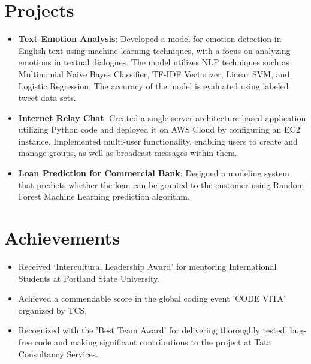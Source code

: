 \documentclass[letterpaper,11pt]{article}
\newcommand{\resumeItem}[2]{
  \item\small{
    \textbf{#1}{: #2 \vspace{-2pt}}
  }
}
\newcommand{\resumeSubItem}[2]{\resumeItem{#1}{#2}\vspace{-4pt}}
\newcommand{\resumeSubHeadingListStart}{\begin{itemize}[leftmargin=*]}
\newcommand{\resumeSubHeadingListEnd}{\end{itemize}}
\newcommand{\resumeItemListStart}{\begin{itemize}}
\newcommand{\resumeItemListEnd}{\end{itemize}\vspace{-5pt}}
\begin{document}
\section{Projects}
  \resumeSubHeadingListStart
    \resumeSubItem{Text Emotion Analysis}
      {Developed a model for emotion detection in English text using machine learning techniques, with a focus on analyzing emotions in textual dialogues. The model utilizes NLP techniques such as Multinomial Naive Bayes Classifier, TF-IDF Vectorizer, Linear SVM, and Logistic Regression. The accuracy of the model is evaluated using labeled tweet data sets.}
    \resumeSubItem{Internet Relay Chat}
      {Created a single server architecture-based application utilizing Python code and deployed it on AWS Cloud by configuring an EC2 instance. Implemented multi-user functionality, enabling users to create and manage groups, as well as broadcast messages within them.}
    \resumeSubItem{Loan Prediction for Commercial Bank}
      {Designed a modeling system that predicts whether the loan can be granted to the customer using Random Forest Machine Learning prediction algorithm.}
  \resumeSubHeadingListEnd


\section{\textbf{Achievements}}
\vspace{-0.4mm}
\resumeItemListStart
    \item {\small Received ‘Intercultural Leadership Award’ for mentoring International Students at Portland State University.\vspace{-8pt}}
    \item {\small Achieved a commendable score in the global coding event 'CODE VITA' organized by TCS.\vspace{-8pt}}
    \item {\small Recognized with the 'Best Team Award' for delivering thoroughly tested, bug-free code and making significant contributions to the project at Tata Consultancy Services.\vspace{-8pt}}
\resumeItemListEnd

\end{document}
